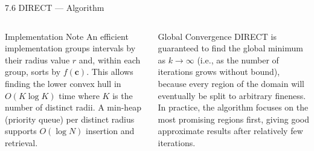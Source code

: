 \documentclass[aspectratio=169,10pt]{beamer}
\begin{document}
\begin{frame}[allowframebreaks]{7.6 DIRECT --- Algorithm}
\begin{columns}[T]
      \begin{block}{Implementation Note}
        An efficient implementation groups intervals by their radius
        value $r$ and, within each group, sorts by $f(\mathbf{c})$.
        This allows finding the lower convex hull in $O(K \log K)$
        time where $K$ is the number of distinct radii.  A min-heap
        (priority queue) per distinct radius supports $O(\log N)$
        insertion and retrieval.
      \end{block}

      \begin{block}{Global Convergence}
        DIRECT is guaranteed to find the global minimum as
        $k \to \infty$ (i.e., as the number of iterations grows without
        bound), because every region of the domain will eventually
        be split to arbitrary fineness.  In practice, the algorithm
        focuses on the most promising regions first, giving good
        approximate results after relatively few iterations.
      \end{block}
  \end{columns}
\end{frame}
\end{document}
